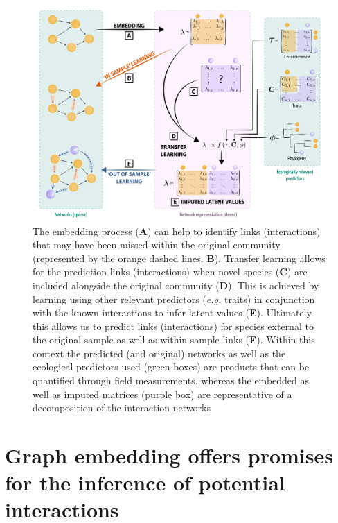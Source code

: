\documentclass[10pt,oneside]{article}
\makeatletter
\def\maxwidth{\ifdim\Gin@nat@width>\linewidth\linewidth
\else\Gin@nat@width\fi}
\let\Oldincludegraphics\includegraphics
\renewcommand{\includegraphics}[1]{\Oldincludegraphics[width=\maxwidth]{#1}}
\makeatother
\begin{document}
\begin{figure}
\hypertarget{fig:embedding}{%
\centering
\includegraphics{figures/conceptual_2.png}
\caption{The embedding process (\textbf{A}) can help to identify links
(interactions) that may have been missed within the original community
(represented by the orange dashed lines, \textbf{B}). Transfer learning
allows for the prediction links (interactions) when novel species
(\textbf{C}) are included alongside the original community (\textbf{D}).
This is achieved by learning using other relevant predictors
(\emph{e.g.} traits) in conjunction with the known interactions to infer
latent values (\textbf{E}). Ultimately this allows us to predict links
(interactions) for species external to the original sample as well as
within sample links (\textbf{F}). Within this context the predicted (and
original) networks as well as the ecological predictors used (green
boxes) are products that can be quantified through field measurements,
whereas the embedded as well as imputed matrices (purple box) are
representative of a decomposition of the interaction
networks}\label{fig:embedding}
}
\end{figure}

\hypertarget{graph-embedding-offers-promises-for-the-inference-of-potential-interactions}{%
\section{Graph embedding offers promises for the inference of potential
interactions}\label{graph-embedding-offers-promises-for-the-inference-of-potential-interactions}}
\end{document}
